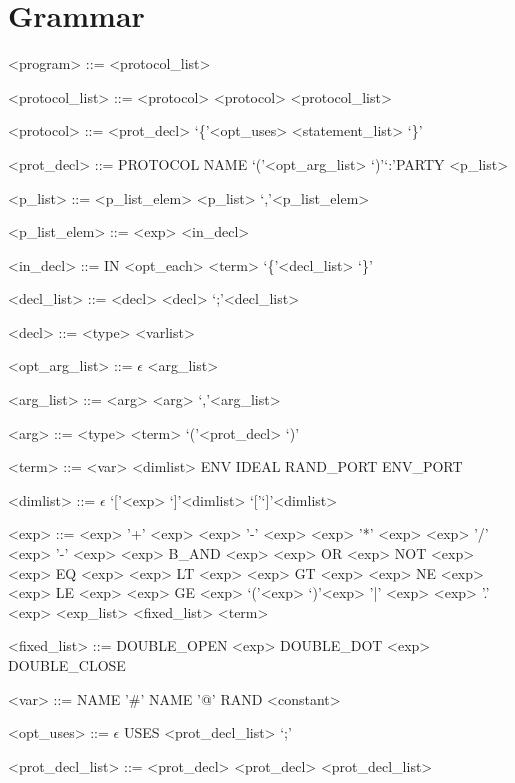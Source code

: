 
\section{Grammar}
\begin{grammar}
<program> ::= <protocol\_list>

<protocol\_list> ::= <protocol> \alt <protocol> <protocol\_list>

<protocol> ::= <prot\_decl> \lq\{\rq <opt\_uses> <statement\_list> \lq\}\rq

<prot\_decl> ::= PROTOCOL NAME \lq(\rq <opt\_arg\_list> \lq)\rq \lq:\rq PARTY <p\_list>

<p\_list> ::= <p\_list\_elem> \alt <p\_list> \lq,\rq <p\_list\_elem>

<p\_list\_elem> ::= <exp> \alt <in\_decl>

<in\_decl> ::= IN <opt\_each> <term> \lq\{\rq <decl\_list> \lq\}\rq

<decl\_list> ::= <decl> \alt <decl> \lq;\rq <decl\_list>

<decl> ::= <type> <varlist>

<opt\_arg\_list> ::= $\epsilon$ \alt <arg\_list>

<arg\_list> ::= <arg> \alt <arg> \lq,\rq <arg\_list>

<arg> ::= <type> <term> \alt \lq(\rq <prot\_decl> \lq)\rq

<term> ::= <var> <dimlist> \alt ENV \alt IDEAL \alt RAND\_PORT \alt ENV\_PORT

<dimlist> ::= $\epsilon$ \alt \lq[\rq <exp> \lq]\rq <dimlist> \alt \lq[\rq \lq]\rq <dimlist>

<exp> ::= <exp> '+' <exp> \alt <exp> '-' <exp> \alt <exp> '*' <exp> \alt <exp> '/' <exp> \alt '-' <exp> \alt <exp> B\_AND <exp> \alt <exp> OR <exp> \alt NOT <exp> \alt <exp> EQ <exp> \alt <exp> LT <exp> \alt <exp> GT <exp> \alt <exp> NE <exp> \alt <exp> LE <exp> \alt <exp> GE <exp> \alt \lq(\rq <exp> \lq)\rq \alt <exp> '|' <exp> \alt <exp> '.' <exp> \alt <exp\_list> \alt <fixed\_list> \alt <term>

<fixed\_list> ::= DOUBLE\_OPEN <exp> DOUBLE\_DOT <exp> DOUBLE\_CLOSE

<var> ::= NAME \alt '\#' NAME \alt '@' \alt RAND \alt <constant>

<opt\_uses> ::= $\epsilon$ \alt USES <prot\_decl\_list> \lq;\rq

<prot\_decl\_list> ::= <prot\_decl> \alt <prot\_decl> <prot\_decl\_list>


\end{grammar}

